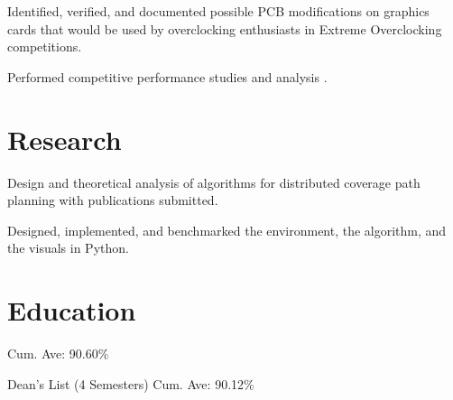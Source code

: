\documentclass[]{deedy-resume-openfont}
\begin{document}
\begin{tightemize}
\item Identified, verified, and documented possible PCB modifications on graphics cards that would be used by overclocking enthusiasts in Extreme Overclocking competitions.
\item Performed competitive performance studies and analysis .
\end{tightemize}
\sectionsep



\section{Research}
\begin{tightemize}
\item Design and theoretical analysis of algorithms for distributed coverage path planning with publications submitted.
\item Designed, implemented, and benchmarked the environment, the algorithm, and the visuals in Python.
\end{tightemize}
\sectionsep

\section{Education}
Cum. Ave: 90.60\% \\
\sectionsep

Dean's List (4 Semesters) \textbullet{}
Cum. Ave: 90.12\% \\
\sectionsep
\end{document}
